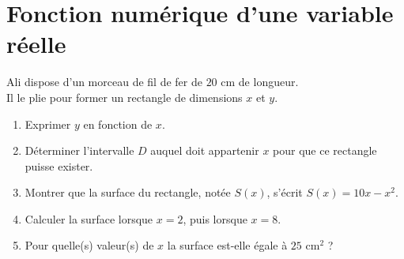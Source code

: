 \documentclass[10pt, a4paper]{article}
\begin{document}
\pagestyle{cours}

\section{Fonction numérique d'une variable réelle }

\begin{Activite}[][15 min]
\noindent
\begin{minipage}[c]{0.7\linewidth}
    Ali dispose d’un morceau de fil de fer de $20$ cm de longueur. \\
    Il le plie pour former un rectangle de dimensions $x$ et $y$.
    \begin{enumerate}[leftmargin=*,itemsep=0.5pt]
        \item Exprimer $y$ en fonction de $x$.
        \item Déterminer l'intervalle $D$ auquel doit appartenir $x$ pour que ce rectangle puisse exister.
        \item Montrer que la surface du rectangle, notée $S(x)$, s'écrit $S(x) = 10x - x^2$.
        \item Calculer la surface lorsque $x = 2$, puis lorsque $x = 8$.
        \item Pour quelle(s) valeur(s) de $x$ la surface est-elle égale à $25\text{ cm}^2$ ?
    \end{enumerate}
\end{minipage}
\hfill
\begin{minipage}[c]{0.3\linewidth}
    \centering
\end{minipage}%
\end{Activite}
\end{document}
